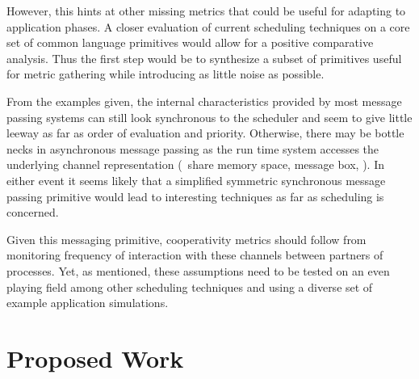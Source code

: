 However, this hints at other missing metrics that could be useful for adapting to application phases. A closer 
evaluation of current scheduling techniques on a core set of common language primitives would allow for a positive
comparative analysis. Thus the first step would be to synthesize a subset of primitives useful for metric gathering 
while introducing as little noise as possible. 

From the examples given, the internal characteristics provided by most message passing systems can still look 
synchronous to the scheduler and seem to give little leeway as far as order of evaluation and priority. Otherwise,
there may be bottle necks in asynchronous message passing as the run time system accesses the underlying channel
representation (\eg~share memory space, message box, \etc). In either event it seems likely that a simplified 
symmetric synchronous message passing primitive would lead to interesting techniques as far as scheduling is 
concerned.

Given this messaging primitive, cooperativity metrics should follow from monitoring frequency of interaction 
with these channels between partners of processes. Yet, as mentioned, these assumptions need to be tested on an 
even playing field among other scheduling techniques and using a diverse set of example application simulations.


\section{Proposed Work} %



